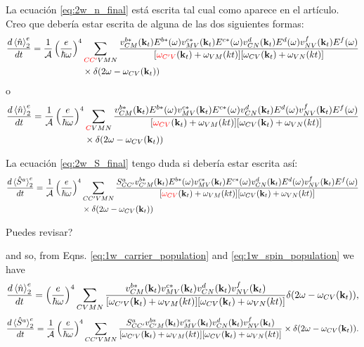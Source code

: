 \documentclass{article}
\newcommand{\kt}{\mathbf{k}_{t}}
\newcommand{\dw}{\delta(2\omega - \omega_{CV}(\kt))}
\begin{document}
{\color{blue} La ecuaci\'on \eqref{eq:2w_n_final} est\'a escrita tal cual
como aparece en el art\'iculo. Creo que deber\'ia estar escrita de alguna de las 
dos siguientes formas:
\begin{equation*}
\begin{split}
\frac{d\ev*{\hat{n}}^{e}_2}{dt} = \frac{1}{\mathcal{A}} \left(\frac{e}{\hbar\omega}\right)^{4} &
\sum_{{\color{red}CC'}VMN} \frac{v^{b*}_{CM}(\kt) E^{b*}(\omega)v^{c*}_{MV}(\kt) E^{c*}(\omega)
v^{d}_{CN}(\kt) E^{d}(\omega)v^{f}_{NV}(\kt) E^{f}(\omega)}
{[{\color{red}\omega_{C'V}}(\kt)+\omega_{VM}(kt)][\omega_{CV}(\kt)+\omega_{VN}(kt)]} \\
& \times \dw
\end{split}
\end{equation*}
o
\begin{equation*}
\begin{split}
\frac{d\ev*{\hat{n}}^{e}_2}{dt} = \frac{1}{\mathcal{A}} \left(\frac{e}{\hbar\omega}\right)^{4} &
\sum_{{\color{red}C}VMN} \frac{v^{b*}_{CM}(\kt) E^{b*}(\omega)v^{c*}_{MV}(\kt) E^{c*}(\omega)
v^{d}_{CN}(\kt) E^{d}(\omega)v^{f}_{NV}(\kt) E^{f}(\omega)}
{[{\color{red}\omega_{CV}}(\kt)+\omega_{VM}(kt)][\omega_{CV}(\kt)+\omega_{VN}(kt)]} \\
& \times \dw
\end{split}
\end{equation*}

La ecuaci\'on \eqref{eq:2w_S_final} tengo duda si deber\'ia estar escrita as\'i:
\begin{equation}
\begin{split}
\frac{d\ev*{\hat{S}^{a}}^{e}_2}{dt}= \frac{1}{\mathcal{A}} \left(\frac{e}{\hbar\omega}\right)^{4} &
\sum_{CC'VMN} \frac{S^{a}_{CC'} v^{b*}_{C'M}(\kt) E^{b*}(\omega)v^{c*}_{MV}(\kt) E^{c*}(\omega)
v^{d}_{CN}(\kt) E^{d}(\omega)v^{f}_{NV}(\kt) E^{f}(\omega)}
{[{\color{red}\omega_{CV}}(\kt)+\omega_{VM}(kt)][\omega_{CV}(\kt)+\omega_{VN}(kt)]} \\
& \times \dw 
\end{split}
\end{equation}

Puedes revisar?
}

and so, from Eqns. \eqref{eq:1w_carrier_population} and
\eqref{eq:1w_spin_population} we have 
\begin{equation}\label{eq:2_carrier_tensor}
\frac{d\ev*{\hat{n}}^{e}_2}{dt}
= \left(\frac{e}{\hbar\omega}\right)^{4}
\sum_{CVMN} \frac{v^{b*}_{CM}(\kt)v^{c*}_{MV}(\kt)
v^{d}_{CN}(\kt)v^{f}_{NV}(\kt)}
{[\omega_{C'V}(\kt)+\omega_{VM}(kt)][\omega_{CV}(\kt)+\omega_{VN}(kt)]} 
\dw,
\end{equation}
\begin{equation}\label{eq:2_spin_tensor}
\frac{d\ev*{\hat{S}^{a}}^{e}_2}{dt}= \frac{1}{\mathcal{A}} \left(\frac{e}{\hbar\omega}\right)^{4} 
\sum_{CC'VMN} \frac{S^{a}_{CC'} v^{b*}_{C'M}(\kt)v^{c*}_{MV}(\kt)
v^{d}_{CN}(\kt)v^{f}_{NV}(\kt)}
{[\omega_{C'V}(\kt)+\omega_{VM}(kt)][\omega_{CV}(\kt)+\omega_{VN}(kt)]} \times \dw.
\end{equation}
\end{document}
